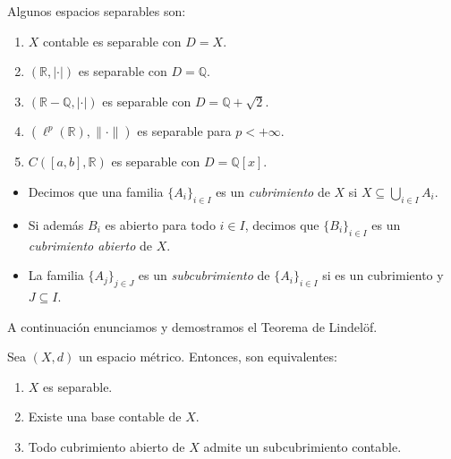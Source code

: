 \begin{example}
	Algunos espacios separables son:
	\begin{enumerate}
		\item $X$ contable es separable con $D = X$.
		\item $(\mathbb{R}, |\cdot|)$ es separable con $D = \mathbb{Q}$.
		\item $(\mathbb{R} - \mathbb{Q}, |\cdot|)$ es separable con $D = \mathbb{Q} + \sqrt{2}$.
		\item $(\ell^{p} (\mathbb{R}), \lVert \cdot \rVert)$ es separable para $p < + \infty$.
		\item $C([a, b], \mathbb{R})$ es separable con $D = \mathbb{Q}[x]$.
	\end{enumerate}
\end{example}

\begin{definition}
	\begin{itemize}
		\item Decimos que una familia $\{ A_i \}_{i \in I}$ es un \emph{cubrimiento} de $X$ si $X \subseteq \bigcup_{i \in I} A_i$.
		\item Si además $B_i$ es abierto para todo $i \in I$, decimos que $\{ B_i \}_{i \in I}$ es un \emph{cubrimiento abierto} de $X$.
		\item La familia $\{ A_j \}_{j \in J}$ es un \emph{subcubrimiento} de $\{ A_i \}_{i \in I}$ si es un cubrimiento y $J \subseteq I$.
	\end{itemize}
\end{definition}

A continuación enunciamos y demostramos el Teorema de Lindelöf.

\begin{theorem}
	Sea $(X, d)$ un espacio métrico. Entonces, son equivalentes:
	\begin{enumerate}
		\item $X$ es separable.
		\item Existe una base contable de $X$.
		\item Todo cubrimiento abierto de $X$ admite un subcubrimiento contable.
	\end{enumerate}
\end{theorem}

